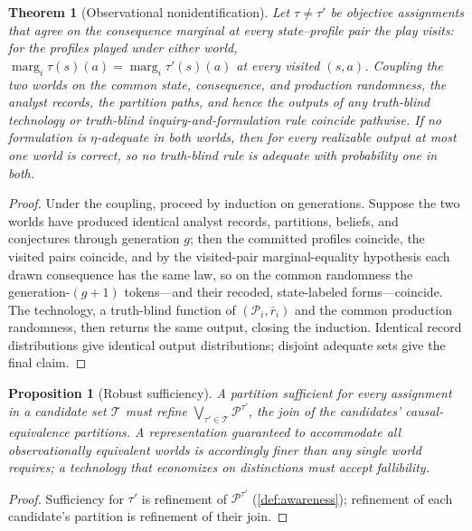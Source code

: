 \documentclass[11pt]{article}
\newtheorem{proposition}[assumption]{Proposition}
\newtheorem{theorem}[assumption]{Theorem}
\theoremstyle{definition}
\newcommand{\marg}[1]{\operatorname{marg}_{#1}}
\begin{document}
\begin{theorem}[Observational nonidentification]
\label{thm:nonidentification}
Let $\tau\neq\tau'$ be objective assignments that agree on the consequence
marginal at every state--profile pair the play visits: for the profiles played
under either world, $\marg{i}\tau(s)(a)=\marg{i}\tau'(s)(a)$ at every visited
$(s,a)$.  Coupling the two worlds on the common state, consequence, and
production randomness, the analyst records, the partition paths, and hence the
outputs of any truth-blind technology or truth-blind
inquiry-and-formulation rule coincide pathwise.  If no formulation is
$\eta$-adequate in both worlds, then for every realizable output at most one
world is correct, so no truth-blind rule is adequate with probability one in
both.
\end{theorem}

\begin{proof}
Under the coupling, proceed by induction on generations.  Suppose the two
worlds have produced identical analyst records, partitions, beliefs, and
conjectures through generation $g$; then the committed profiles coincide, the
visited pairs coincide, and by the visited-pair marginal-equality hypothesis
each drawn consequence has the same law, so on the common randomness the
generation-$(g+1)$ tokens---and their recoded, state-labeled forms---coincide.
The technology, a truth-blind function of $(\mathcal P_i,\bar r_i)$ and the
common production randomness, then returns the same output, closing the
induction.  Identical record distributions give identical output
distributions; disjoint adequate sets give the final claim.
\end{proof}

\begin{proposition}[Robust sufficiency]
\label{prop:robust-sufficiency}
A partition sufficient for every assignment in a candidate set $\mathcal T$
must refine $\bigvee_{\tau'\in\mathcal T}\mathcal P^{\tau'}$, the join of the
candidates' causal-equivalence partitions.  A representation guaranteed to
accommodate all observationally equivalent worlds is accordingly finer than
any single world requires; a technology that economizes on distinctions must
accept fallibility.
\end{proposition}

\begin{proof}
Sufficiency for $\tau'$ is refinement of $\mathcal P^{\tau'}$
(\cref{def:awareness}); refinement of each candidate's partition is
refinement of their join.
\end{proof}
\end{document}
